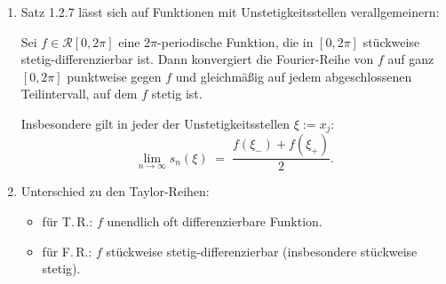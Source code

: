 \begin{bemerkungbox}
    \begin{enumerate}
        \item Satz 1.2.7 lässt sich auf Funktionen mit Unstetigkeitsstellen verallgemeinern:

            Sei $f\in\mathcal{R}[0,2\pi]$ eine $2\pi$-periodische Funktion, die in $[0,2\pi]$ stückweise stetig-differenzierbar ist.
            Dann konvergiert die Fourier-Reihe von $f$ auf ganz $[0,2\pi]$ punktweise gegen $f$ und gleichmäßig auf jedem abgeschlossenen Teilintervall, auf dem $f$ stetig ist.

            Insbesondere gilt in jeder der Unstetigkeitsstellen $\xi:=x_j$:
            $$
            \lim_{n\to\infty} s_n(\xi) \;=\; \frac{f(\xi_-)+f(\xi_+)}{2}.
            $$

        \item Unterschied zu den Taylor-Reihen:
            \begin{itemize}
            \item für T.\,R.: $f$ unendlich oft differenzierbare Funktion.
            \item für F.\,R.: $f$ stückweise stetig-differenzierbar (insbesondere stückweise stetig).
            \end{itemize}
    \end{enumerate}
\end{bemerkungbox}
